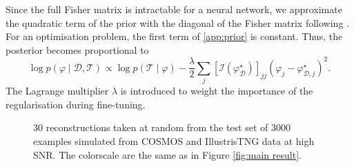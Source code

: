 \documentclass[twocolumn]{aastex631}
\begin{document}
Since the full Fisher matrix is intractable for a neural network, we approximate the 
quadratic term of the prior with the diagonal of the Fisher matrix following \citet{Kirkpatrick2016}. 
For an optimisation problem, the first term of \eqref{app:prior} is constant. Thus,
the posterior becomes proportional to
\begin{equation}
        \log p(\varphi \mid \mathcal{D}, \mathcal{T}) \propto 
        \log p(\mathcal{T} \mid \varphi ) - 
         \frac{\lambda}{2} 
        \sum_{j}[\mathcal{I}(\varphi^{\star}_{\mathcal{D}})]_{jj}(\varphi_j - \varphi^{\star}_{\mathcal{D},j})^2.
\end{equation} 
The Lagrange multiplier $\lambda$ is introduced to weight the importance of the regularisation 
during fine-tuning.

\begin{figure}[ht!]
        \centering
        \caption{
                30 reconstructions taken at random from the test set of 3000 examples simulated from COSMOS 
                and IllustrisTNG data at high SNR.
                The colorscale are the same as in Figure \ref{fig:main result}.}
        \label{fig:random sample}
\end{figure}
\end{document}
